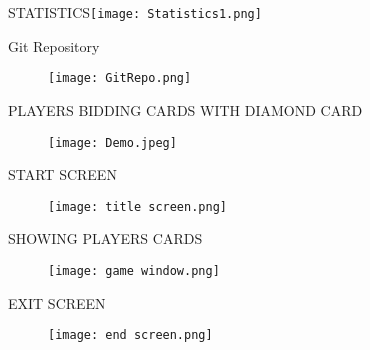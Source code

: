 \documentclass[12pt]{beamer}
\begin{document}
\begin{frame}{STATISTICS}\texttt{[image: Statistics1.png]}
\end{frame}
\begin{frame}{Git Repository}
\begin{figure}
\texttt{[image: GitRepo.png]}
\end{figure}
\end{frame}
\begin{frame}{PLAYERS BIDDING CARDS WITH DIAMOND CARD}
\begin{figure}
\texttt{[image: Demo.jpeg]}
\end{figure}
\end{frame}
\begin{frame}{START SCREEN}
\begin{figure}
\texttt{[image: title screen.png]}
\end{figure}
\end{frame}
\begin{frame}{SHOWING PLAYERS CARDS}
\begin{figure}
\texttt{[image: game window.png]}
\end{figure}
\end{frame}
\begin{frame}{EXIT SCREEN}
\begin{figure}
\texttt{[image: end screen.png]}
\end{figure}
\end{frame}

\begin{frame}
\end{frame}
\end{document}
